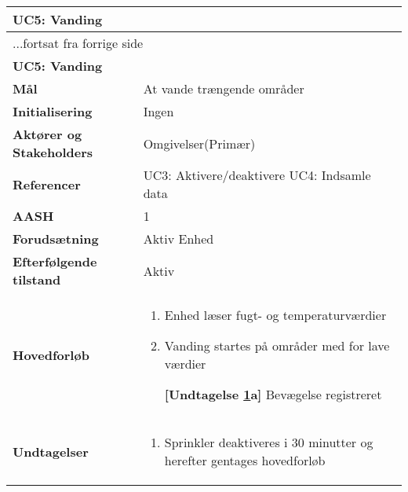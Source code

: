 \begin{center} \centering \label{UC5} 
	\begin{longtable}{|p{5cm}|p{9cm}|}  %
	\hline
		\multicolumn{2}{|l|}{\textbf{UC5: Vanding}} 		\\\hline %
		\endfirsthead
		
		\multicolumn{2}{l}{...fortsat fra forrige side} 	\\ \hline %
		\multicolumn{2}{|l|}{\textbf{UC5: Vanding}} 		\\\hline %
		\endhead	
		
		\textbf{Mål}								&At vande trængende områder	\\\hline
		\textbf{Initialisering}					&Ingen						\\\hline
		\textbf{Aktører og Stakeholders}			&Omgivelser(Primær)			\\\hline
		\textbf{Referencer}						&UC3: Aktivere/deaktivere	\newline
												 UC4: Indsamle data 			\\\hline
		\textbf{AASH}							&1							\\\hline
		\textbf{Forudsætning}					&Aktiv Enhed					\\\hline
		\textbf{Efterfølgende tilstand}			&Aktiv						\\\hline
		\textbf{Hovedforløb}					
			&\begin{enumerate}
				
				\item Enhed læser fugt- og temperaturværdier
				
				\item \label{uc5sprinkler} Vanding startes på områder med for lave værdier
				
					\textbf{[Undtagelse \ref{uc5sprinkler}a]} Bevægelse registreret
	
			\end{enumerate}\\\hline

		\textbf{Undtagelser}
			&\begin{enumerate}[label=\ref{uc5sprinkler}a.]
			
				\item Sprinkler deaktiveres i 30 minutter og herefter gentages hovedforløb	
			
			\end{enumerate}\\\hline
	\end{longtable}
\end{center}

